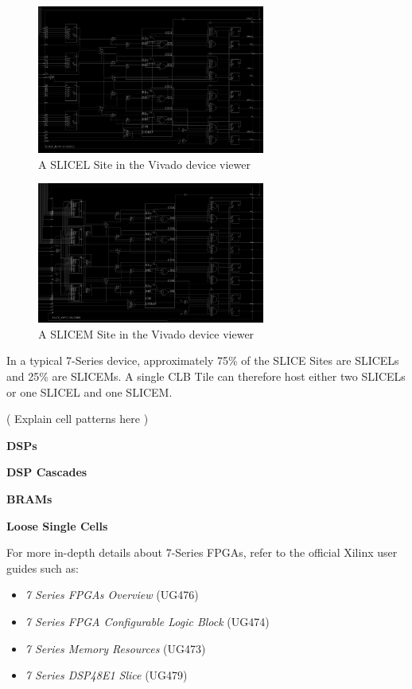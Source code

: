 \documentclass[twocolumn]{article}
\begin{document}
    \begin{figure}[h]
        \centering
        \includegraphics[width=7.5cm]{figures/slicel.png}
        \caption{A SLICEL Site in the Vivado device viewer}
        \label{fig:slicel}
    \end{figure}

    \begin{figure}[h]
        \centering
        \includegraphics[width=7.5cm]{figures/slicem.png}
        \caption{A SLICEM Site in the Vivado device viewer}
        \label{fig:slicem}
    \end{figure}

    In a typical 7-Series device, approximately 75\% of the SLICE Sites are SLICELs and 25\% are SLICEMs. 
    A single CLB Tile can therefore host either two SLICELs or one SLICEL and one SLICEM.

    ( Explain cell patterns here )


    \textbf{DSPs} \quad 

    \textbf{DSP Cascades} \quad 

    \textbf{BRAMs} \quad 

    \textbf{Loose Single Cells} \quad


    For more in-depth details about 7-Series FPGAs, refer to the official Xilinx user guides such as:
    \begin{itemize}
        \item \emph{7 Series FPGAs Overview} (UG476)
        \item \emph{7 Series FPGA Configurable Logic Block} (UG474)
        \item \emph{7 Series Memory Resources} (UG473)
        \item \emph{7 Series DSP48E1 Slice} (UG479)
    \end{itemize}
\end{document}

